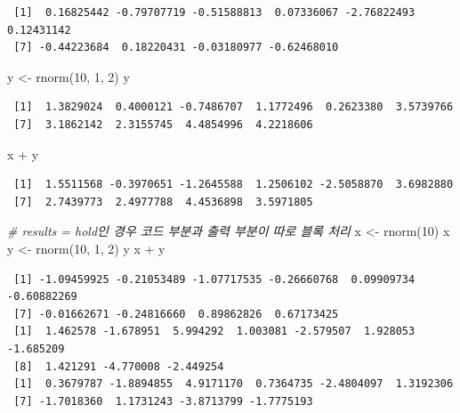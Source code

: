 \documentclass[
  11pt,
]{krantz}
\newenvironment{Shaded}{\begin{snugshade}}{\end{snugshade}}
\newcommand{\CommentTok}[1]{\textcolor[rgb]{0.37,0.37,0.37}{\textit{#1}}}
\newcommand{\DecValTok}[1]{\textcolor[rgb]{0.06,0.06,0.06}{#1}}
\newcommand{\FunctionTok}[1]{\textcolor[rgb]{0,0,0}{#1}}
\newcommand{\NormalTok}[1]{#1}
\newcommand{\OtherTok}[1]{\textcolor[rgb]{0.37,0.37,0.37}{#1}}
\newcommand{\SpecialCharTok}[1]{\textcolor[rgb]{0,0,0}{#1}}
\begin{document}
\begin{verbatim}
 [1]  0.16825442 -0.79707719 -0.51588813  0.07336067 -2.76822493  0.12431142
 [7] -0.44223684  0.18220431 -0.03180977 -0.62468010
\end{verbatim}

\begin{Shaded}
\begin{Highlighting}[]
\NormalTok{y }\OtherTok{\textless{}{-}} \FunctionTok{rnorm}\NormalTok{(}\DecValTok{10}\NormalTok{, }\DecValTok{1}\NormalTok{, }\DecValTok{2}\NormalTok{)}
\NormalTok{y}
\end{Highlighting}
\end{Shaded}

\begin{verbatim}
 [1]  1.3829024  0.4000121 -0.7486707  1.1772496  0.2623380  3.5739766
 [7]  3.1862142  2.3155745  4.4854996  4.2218606
\end{verbatim}

\begin{Shaded}
\begin{Highlighting}[]
\NormalTok{x }\SpecialCharTok{+}\NormalTok{ y}
\end{Highlighting}
\end{Shaded}

\begin{verbatim}
 [1]  1.5511568 -0.3970651 -1.2645588  1.2506102 -2.5058870  3.6982880
 [7]  2.7439773  2.4977788  4.4536898  3.5971805
\end{verbatim}

\normalsize

\footnotesize

\begin{Shaded}
\begin{Highlighting}[]
\CommentTok{\# results = \textquotesingle{}hold\textquotesingle{}인 경우 코드 부분과 출력 부분이 따로 블록 처리}
\NormalTok{x }\OtherTok{\textless{}{-}} \FunctionTok{rnorm}\NormalTok{(}\DecValTok{10}\NormalTok{)}
\NormalTok{x}
\NormalTok{y }\OtherTok{\textless{}{-}} \FunctionTok{rnorm}\NormalTok{(}\DecValTok{10}\NormalTok{, }\DecValTok{1}\NormalTok{, }\DecValTok{2}\NormalTok{)}
\NormalTok{y}
\NormalTok{x }\SpecialCharTok{+}\NormalTok{ y}
\end{Highlighting}
\end{Shaded}

\begin{verbatim}
 [1] -1.09459925 -0.21053489 -1.07717535 -0.26660768  0.09909734 -0.60882269
 [7] -0.01662671 -0.24816660  0.89862826  0.67173425
 [1]  1.462578 -1.678951  5.994292  1.003081 -2.579507  1.928053 -1.685209
 [8]  1.421291 -4.770008 -2.449254
 [1]  0.3679787 -1.8894855  4.9171170  0.7364735 -2.4804097  1.3192306
 [7] -1.7018360  1.1731243 -3.8713799 -1.7775193
\end{verbatim}
\end{document}
